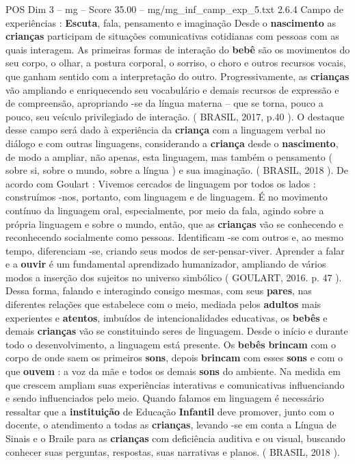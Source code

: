 \begin{textsample}{POS Dim 3 – mg – Score 35.00 – mg/mg\_inf\_camp\_exp\_5.txt}  \label{ex:f3_pos_261}
2.6.4 Campo de experiências : \textbf{Escuta}, fala, pensamento e imaginação Desde o \textbf{nascimento} as \textbf{crianças} participam de situações comunicativas cotidianas com pessoas com as quais interagem.
As primeiras formas de interação do \textbf{bebê} são os movimentos do seu corpo, o olhar, a postura corporal, o sorriso, o choro e outros recursos vocais, que ganham sentido com a interpretação do outro.
Progressivamente, as \textbf{crianças} vão ampliando e enriquecendo seu vocabulário e demais recursos de expressão e de compreensão, apropriando -se da língua materna – que se torna, pouco a pouco, seu veículo privilegiado de interação. ( BRASIL, 2017, p.40 ).
O destaque desse campo será dado à experiência da \textbf{criança} com a linguagem verbal no diálogo e com outras linguagens, considerando a \textbf{criança} desde o \textbf{nascimento}, de modo a ampliar, não apenas, esta linguagem, mas também o pensamento ( sobre si, sobre o mundo, sobre a língua ) e sua imaginação. ( BRASIL, 2018 ).
De acordo com Goulart : Vivemos cercados de linguagem por todos os lados : construímos -nos, portanto, com linguagem e de linguagem.
É no movimento contínuo da linguagem oral, especialmente, por meio da fala, agindo sobre a própria linguagem e sobre o mundo, então, que as \textbf{crianças} vão se conhecendo e reconhecendo socialmente como pessoas.
Identificam -se com outros e, ao mesmo tempo, diferenciam -se, criando seus modos de ser-pensar-viver.
Aprender a falar e a \textbf{ouvir} é um fundamental aprendizado humanizador, ampliando de vários modos a inserção dos sujeitos no universo simbólico ( GOULART, 2016. p. 47 ).
Dessa forma, falando e interagindo consigo mesmas, com seus \textbf{pares}, nas diferentes relações que estabelece com o meio, mediada pelos \textbf{adultos} mais experientes e \textbf{atentos}, imbuídos de intencionalidades educativas, os \textbf{bebês} e demais \textbf{crianças} vão se constituindo seres de linguagem.
Desde o início e durante todo o desenvolvimento, a linguagem está presente.
Os \textbf{bebês} \textbf{brincam} com o corpo de onde saem os primeiros \textbf{sons}, depois \textbf{brincam} com esses \textbf{sons} e com o que \textbf{ouvem} : a voz da mãe e todos os demais \textbf{sons} do ambiente.
Na medida em que crescem ampliam suas experiências interativas e comunicativas influenciando e sendo influenciados pelo meio.
Quando falamos em linguagem é necessário ressaltar que a \textbf{instituição} de Educação \textbf{Infantil} deve promover, junto com o docente, o atendimento a todas as \textbf{crianças}, levando -se em conta a Língua de Sinais e o Braile para as \textbf{crianças} com deficiência auditiva e ou visual, buscando conhecer suas perguntas, respostas, suas narrativas e planos. ( BRASIL, 2018 ).

\end{textsample}
